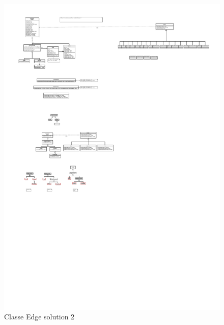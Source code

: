 \documentclass[french]{article}
\begin{document}
			\begin{figure}[H]
				\centering
				\includegraphics[scale=4.0]{Conception/graph/classedgesol2.pdf}
				\caption{Classe Edge solution 2}
			\end{figure}
			
\end{document}
